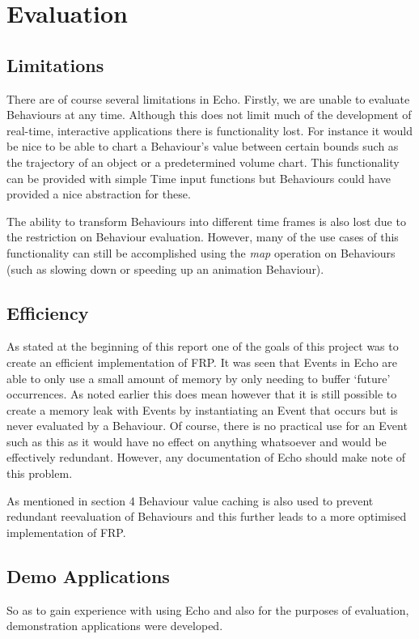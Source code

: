 \chapter{Evaluation}    
  \section{Limitations}
    There are of course several limitations in Echo. Firstly, we are unable to evaluate Behaviours at any time.
    Although this does not limit much of the development of real-time, interactive applications there is functionality
    lost. For instance it would be nice to be able to chart a Behaviour's value between certain bounds such as
    the trajectory of an object or a predetermined volume chart. This functionality can be provided with simple
    Time input functions but Behaviours could have provided a nice abstraction for these.
    
    The ability to transform Behaviours into different time frames is also lost due to the restriction on Behaviour
    evaluation. However, many of the use cases of this functionality can still be accomplished using the
    \emph{map} operation on Behaviours (such as slowing down or speeding up an animation Behaviour).
    
  \section{Efficiency}
    As stated at the beginning of this report one of the goals of this project was to create an efficient implementation
    of FRP. It was seen that Events in Echo are able to only use a small amount of memory by only
    needing to buffer `future' occurrences. As noted earlier this does mean however that it is still
    possible to create a memory leak with Events by instantiating an Event that occurs but is never 
    evaluated by a Behaviour. Of course, there is no practical use for an Event such as this as
    it would have no effect on anything whatsoever and would be effectively redundant. However, any documentation
    of Echo should make note of this problem.
    
    As mentioned in section 4 Behaviour value caching is also used to prevent redundant reevaluation of Behaviours
    and this further leads to a more optimised implementation of FRP.
  
  \section{Demo Applications}
    So as to gain experience with using Echo and also for the purposes of evaluation, demonstration
    applications were developed. 
    
